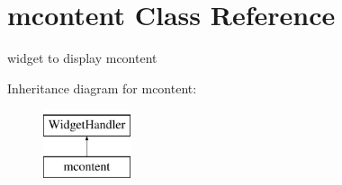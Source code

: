 \hypertarget{classmcontent}{}\section{mcontent Class Reference}
\label{classmcontent}


widget to display mcontent  


Inheritance diagram for mcontent\+:\begin{figure}[H]
\begin{center}
\leavevmode
\includegraphics[height=2.000000cm]{classmcontent}
\end{center}
\end{figure}
